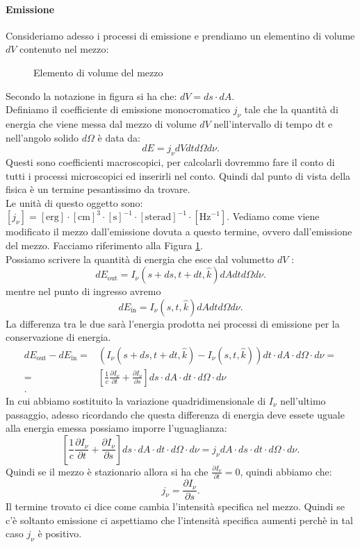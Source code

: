 \paragraph{Emissione}%
Consideriamo adesso i processi di emissione e prendiamo un elementino di volume $dV$ contenuto nel mezzo: 
\begin{figure}[H]
    \centering
    \caption{Elemento di volume del mezzo}
    \label{fig:elemento-di-volume-del-mezzo}
\end{figure}
\noindent
Secondo la notazione in figura si ha che: $dV = ds\cdot dA$.\\
Definiamo il coefficiente di emissione monocromatico $j _{\nu}$ tale che la quantità di energia che viene messa dal mezzo di volume $dV$ nell'intervallo di tempo dt e nell'angolo solido $d\Omega$ è data da:
\[
	dE = j _{\nu} dV dt d\Omega d\nu
.\] 
Questi sono coefficienti macroscopici, per calcolarli dovremmo fare il conto di tutti i processi microscopici ed inserirli nel conto. Quindi dal punto di vista della fisica è un termine pesantissimo da trovare.\\
Le unità di questo oggetto sono: $\left[ j _{\nu} \right] = \left[ \text{erg} \right] \cdot \left[ \text{cm} \right]^3 \cdot \left[ \text{s} \right]^{-1} \cdot \left[ \text{sterad} \right]^{-1} \cdot \left[ \text{Hz}^{-1} \right]$.
Vediamo come viene modificato il mezzo dall'emissione dovuta a questo termine, ovvero dall'emissione del mezzo. Facciamo riferimento alla Figura \ref{fig:elemento-di-volume-del-mezzo}.\\
Possiamo scrivere la quantità di energia che esce dal volumetto $dV$ :
\[
	dE_{\text{out}} = I_{\nu}\left( s+ds, t+dt, \hat{k} \right) dA dt d\Omega d\nu
.\] 
mentre nel punto di ingresso avremo
\[
	dE_{\text{in}} = I_{\nu}\left( s, t, \hat{k} \right) dA dt d\Omega d\nu
.\] 
La differenza tra le due sarà l'energia prodotta nei processi di emissione per la conservazione di energia.
\begin{align*}
	dE_{\text{out}}- dE_{\text{in}} =& \left( I_{\nu}\left(s+ds,t+dt,\hat{k}\right)-I_{\nu}\left(s,t,\hat{k}\right)\right)dt\cdot dA\cdot d\Omega\cdot  d\nu = \\
	=& \left[ \frac{1}{c}\frac{\partial I_{\nu}}{\partial t} + \frac{\partial I_{\nu}}{\partial s}  \right] ds\cdot dA\cdot dt\cdot d\Omega\cdot  d\nu  \\
.\end{align*}
In cui abbiamo sostituito la variazione quadridimensionale di $I_{\nu}$ nell'ultimo passaggio, adesso ricordando che questa differenza di energia deve essete uguale alla energia emessa possiamo imporre l'uguaglianza:
\[
	\left[ \frac{1}{c}\frac{\partial I_{\nu}}{\partial t} + \frac{\partial I_{\nu}}{\partial s}  \right] ds\cdot dA\cdot dt\cdot d\Omega\cdot  d\nu  = 
	j _{\nu} dA \cdot ds\cdot  dt\cdot  d\Omega\cdot  d\nu
.\] 
Quindi se il mezzo è stazionario allora si ha che $\frac{\partial I_{\nu}}{\partial t} = 0$, quindi abbiamo che:
\[
	j _{\nu}= \frac{\partial I_{\nu}}{\partial s} 
.\] 
Il termine trovato ci dice come cambia l'intensità specifica nel mezzo. Quindi se c'è soltanto emissione ci aspettiamo che l'intensità specifica aumenti perchè in tal caso $j_{\nu}$ è positivo.
